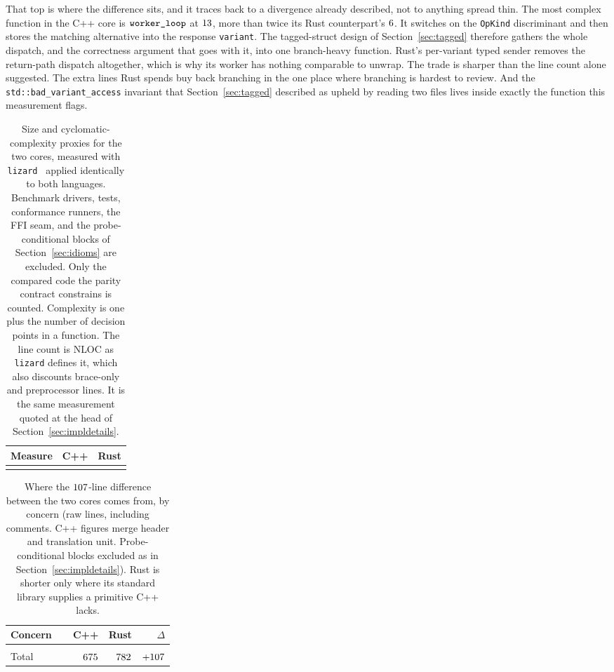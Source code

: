 \documentclass[english,oneside,a4paper,censored,csm,software-track-2020]{HYthesisML}
\begin{document}
That top is where the difference sits, and it traces back to a divergence already described,
not to anything spread thin. The most complex function in the C++ core is
$\texttt{worker\_loop}$ at $13$, more than twice its Rust counterpart's $6$. It
switches on the \texttt{OpKind} discriminant and then stores the matching alternative into the
response \texttt{variant}. The tagged-struct design of Section~\ref{sec:tagged} therefore
gathers the whole dispatch, and the correctness argument that goes with it, into one branch-heavy
function. Rust's per-variant typed sender removes the return-path dispatch altogether, which is
why its worker has nothing comparable to unwrap. The trade is sharper than the line
count alone suggested. The extra lines Rust spends buy back branching in the one place where
branching is hardest to review. And the \texttt{std::bad\_variant\_access} invariant that
Section~\ref{sec:tagged} described as upheld by reading two files lives inside
exactly the function this measurement flags.

\begin{table}[H]
\centering
\small
\caption[Size and cyclomatic-complexity proxies for the two cores]{Size and cyclomatic-complexity proxies for the two cores, measured with
\texttt{lizard}~\cite{lizard} applied identically to both languages. Benchmark drivers, tests,
conformance runners, the FFI seam, and the probe-conditional blocks of
Section~\ref{sec:idioms} are excluded. Only the compared code the parity contract constrains is
counted. Complexity is one plus the number of decision points in a function. The line count is
NLOC as \texttt{lizard} defines it, which also discounts brace-only and preprocessor lines. It
is the same measurement quoted at the head of
Section~\ref{sec:impldetails}.\label{tab:complexity}}
\begin{tabular}{@{}l r r@{}}
\hline\hline
Measure & C++ & Rust \\
\hline
\\
\hline
\end{tabular}
\end{table}

\begin{table}[H]
\centering
\small
\caption[Where the line-count difference between the cores comes from]{Where the $\LocGap$-line difference between the two cores comes from, by concern (raw
lines, including comments. C++ figures merge header and translation unit. Probe-conditional
blocks excluded as in Section~\ref{sec:impldetails}). Rust is shorter
only where its standard library supplies a primitive C++ lacks.\label{tab:loc}}
\begin{tabular}{@{}R{0.38\linewidth} r r r@{}}
\hline\hline
Concern & C++ & Rust & $\Delta$ \\
\hline
\\
\hline
Total                             & $675$ & $782$ & $+107$ \\
\hline
\end{tabular}
\end{table}
\end{document}
